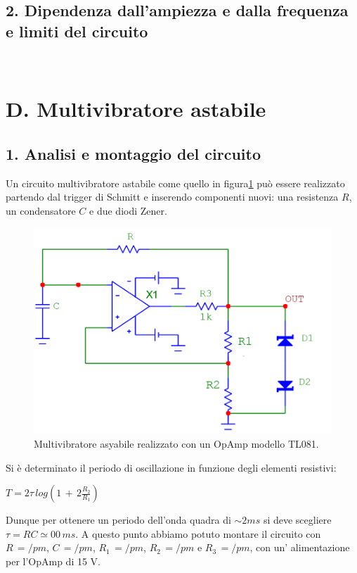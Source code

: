 \documentclass[10pt,a4paper]{article}
\begin{document}
{\subsection*{2. Dipendenza dall'ampiezza e dalla frequenza e limiti del circuito}
\\


\section*{D. Multivibratore astabile}
\subsection*{1. Analisi e montaggio del circuito}

Un circuito multivibratore astabile come quello in figura\ref{circuito4} può essere realizzato partendo dal trigger di Schmitt e inserendo componenti nuovi: una resistenza $R$, un condensatore $C$ e due diodi Zener.\\
\begin{figure}[h]
\centering
\includegraphics[scale=0.5]{multivibratoreAstabile.png}
\caption{Multivibratore asyabile realizzato con un OpAmp modello TL081.\label{circuito4}}
\end{figure}

Si è determinato il periodo di oscillazione in funzione degli elementi resistivi: 
\begin{center}
$T=2\tau\, log\left( 1\,+\,2\frac{R_2}{R_1}\right)$ 
\end{center}
Dunque per ottenere un periodo dell'onda quadra di $\sim 2ms$ si deve scegliere $\tau = RC\simeq 00\,ms$.
A questo punto abbiamo potuto montare il circuito con $R\,= /pm $, $C\,= /pm $, $R_1\,= /pm $, $R_2\,= /pm $ e $R_3\,= /pm $, con un' alimentazione per l'OpAmp di 15 V.\\

}
\end{document}

